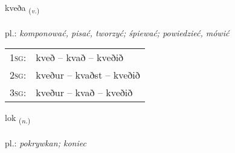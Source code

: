 \documentclass[frontgrid, backgrid]{flacards}\usepackage[]{graphicx}\usepackage[]{xcolor}
\begin{document}
\renewcommand{\blhead}{\vskip5pt {\small\bfseries\footnotesize Sagnorð | Verb }}
\renewcommand{\bcfoot}{\vskip5pt \hspace{2pt}{\small\bfseries\footnotesize 1K}}


{kveða \small{\textsubscript{(\textit{v.})}} \\[1ex] %
\textphonetic{[kʰvɛːða]} \\
pl.: \emph{komponować, pisać, tworzyć; śpiewać; powiedzieć, mówić} \\  [2ex]
\renewcommand*{\arraystretch}{0.8}
\begin{tabular}{p{1cm}l}
\textsc{1sg}: & kveð -- kvað -- kveðið \\ 
\textsc{2sg}: & kveður -- kvaðst -- kveðið \\ 
\textsc{3sg}: & kveður -- kvað -- kveðið \\ 
\end{tabular}
}

\renewcommand{\flhead}{\vskip5pt \fboxsep=0pt {\small\bfseries\footnotesize Nafnorð | Noun}}
\renewcommand{\fcfoot}{\vskip5pt \fboxsep=0pt \hspace{2pt}{\small\bfseries\footnotesize 1K}}

\renewcommand{\blhead}{\vskip5pt {\small\bfseries\footnotesize Nafnorð | Noun }}
\renewcommand{\bcfoot}{\vskip5pt \hspace{2pt}{\small\bfseries\footnotesize 1K}}


{lok \small{\textsubscript{(\textit{n.})}} \\[1ex] %
\textphonetic{[lɔːk]} \\
pl.: \emph{pokrywkan; koniec} \\  [2ex]
\renewcommand*{\arraystretch}{0.8}
}
\end{document}
